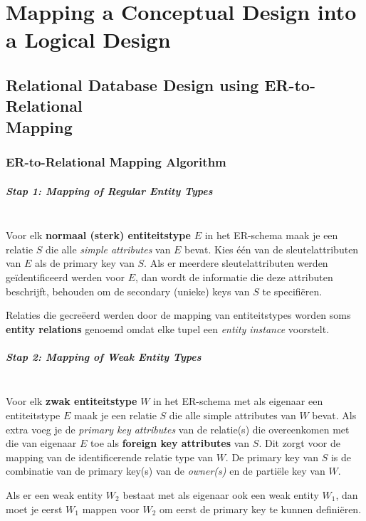\chapter{Mapping a Conceptual Design into a Logical Design}
\section[Relational Database Design using ER-to-Relational Mapping]{Relational Database Design using ER-to-Relational\\Mapping}
\subsection{ER-to-Relational Mapping Algorithm}
\paragraph{Stap 1: Mapping of Regular Entity Types}~\vspace{2mm}\\
Voor elk \textbf{normaal (sterk) entiteitstype} $E$ in het ER-schema maak je een relatie $S$ die alle \textit{simple attributes} van $E$ bevat. Kies \'e\'en van de sleutelattributen van $E$ als de primary key van $S$. Als er meerdere sleutelattributen werden ge\"identificeerd werden voor $E$, dan wordt de informatie die deze attributen beschrijft, behouden om de secondary (unieke) keys van $S$ te specifi\"eren.

Relaties die gecre\"eerd werden door de mapping van entiteitstypes worden soms \textbf{entity relations} genoemd omdat elke tupel een \textit{entity instance} voorstelt.

\paragraph{Stap 2: Mapping of Weak Entity Types}~\vspace{2mm}\\
Voor elk \textbf{zwak entiteitstype} $W$ in het ER-schema met als eigenaar een entiteitstype $E$ maak je een relatie $S$ die alle simple attributes van $W$ bevat. Als extra voeg je de \textit{primary key attributes} van de relatie(s) die overeenkomen met die van eigenaar $E$ toe als \textbf{foreign key attributes} van $S$. Dit zorgt voor de mapping van de identificerende relatie type van $W$. De primary key van $S$ is de combinatie van de primary key(s) van de \textit{owner(s)} en de parti\"ele key van $W$.

Als er een weak entity $W_2$ bestaat met als eigenaar ook een weak entity $W_1$, dan moet je eerst $W_1$ mappen voor $W_2$ om eerst de primary key te kunnen defini\"eren. 

